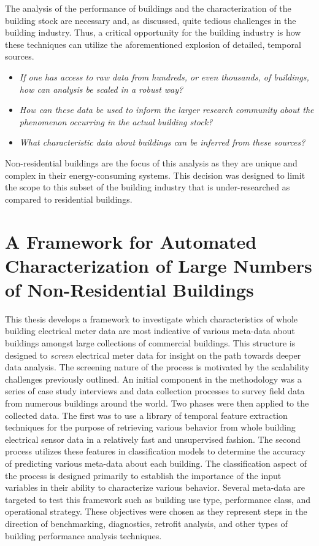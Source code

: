 The analysis of the performance of buildings and the characterization of the building stock are necessary and, as discussed, quite tedious challenges in the building industry. Thus, a critical opportunity for the building industry is how these techniques can utilize the aforementioned explosion of detailed, temporal sources. 

\begin{itemize}
  \item \emph{If one has access to raw data from hundreds, or even thousands, of buildings, how can analysis be scaled in a robust way?}
  \item \emph{How can these data be used to inform the larger research community about the phenomenon occurring in the actual building stock?}
  \item \emph{What characteristic data about buildings can be inferred from these sources?}
\end{itemize} 

Non-residential buildings are the focus of this analysis as they are unique and complex in their energy-consuming systems. This decision was designed to limit the scope to this subset of the building industry that is under-researched as compared to residential buildings.

\section{A Framework for Automated Characterization of Large Numbers of Non-Residential Buildings}
\label{sec:frameworkforanalysis}

This thesis develops a framework to investigate which characteristics of whole building electrical meter data are most indicative of various meta-data about buildings amongst large collections of commercial buildings. This structure is designed to \emph{screen} electrical meter data for insight on the path towards deeper data analysis. The screening nature of the process is motivated by the scalability challenges previously outlined. An initial component in the methodology was a series of case study interviews and data collection processes to survey field data from numerous buildings around the world. Two phases were then applied to the collected data. The first was to use a library of temporal feature extraction techniques for the purpose of retrieving various behavior from whole building electrical sensor data in a relatively fast and unsupervised fashion. The second process utilizes these features in classification models to determine the accuracy of predicting various meta-data about each building. The classification aspect of the process is designed primarily to establish the importance of the input variables in their ability to characterize various behavior. Several meta-data are targeted to test this framework such as building use type, performance class, and operational strategy. These objectives were chosen as they represent steps in the direction of benchmarking, diagnostics, retrofit analysis, and other types of building performance analysis techniques. 

